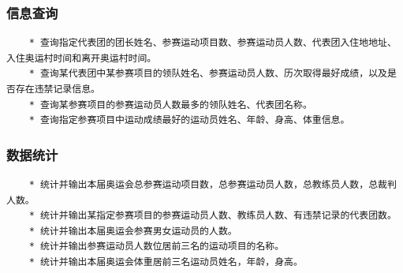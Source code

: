 \documentclass[10pt,a4paper]{article}
\begin{document}
\subsubsection{信息查询}
\begin{verbatim}
    * 查询指定代表团的团长姓名、参赛运动项目数、参赛运动员人数、代表团入住地地址、入住奥运村时间和离开奥运村时间。
    * 查询某代表团中某参赛项目的领队姓名、参赛运动员人数、历次取得最好成绩，以及是否存在违禁记录信息。
    * 查询某参赛项目的参赛运动员人数最多的领队姓名、代表团名称。
    * 查询指定参赛项目中运动成绩最好的运动员姓名、年龄、身高、体重信息。
\end{verbatim}
\subsubsection{数据统计}
\begin{verbatim}
    * 统计并输出本届奥运会总参赛运动项目数，总参赛运动员人数，总教练员人数，总裁判人数。
    * 统计并输出某指定参赛项目的参赛运动员人数、教练员人数、有违禁记录的代表团数。
    * 统计并输出本届奥运会参赛男女运动员的人数。
    * 统计并输出参赛运动员人数位居前三名的运动项目的名称。
    * 统计并输出本届奥运会体重居前三名运动员姓名，年龄，身高。
\end{verbatim}
\end{document}
